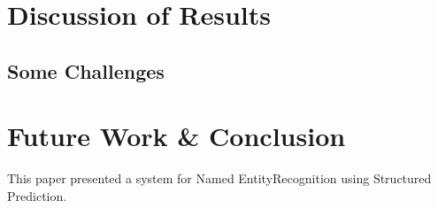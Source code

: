 \documentclass[11pt]{article}
\newcommand{\namedentity}{Named Entity}
\begin{document}
\section{Discussion of Results}

\subsection*{Some Challenges} %


\section{Future Work \& Conclusion}

This paper presented a system for \namedentity Recognition using Structured Prediction. 




\end{document}

